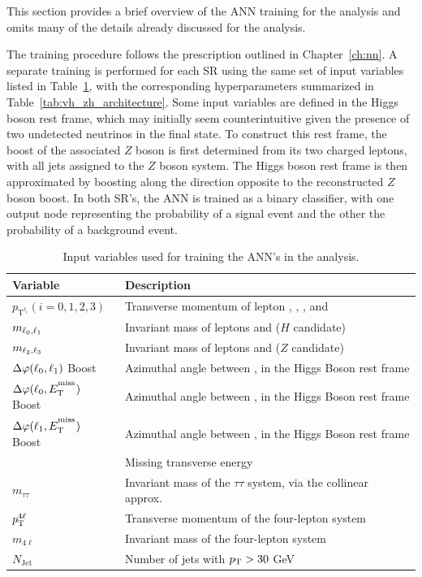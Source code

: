 This section provides a brief overview of the ANN training for the \zh{} analysis and omits many of the details already discussed for the \wh{} analysis.

The training procedure follows the prescription outlined in Chapter~\ref{ch:nn}. A separate training is performed for each SR using the same set of input variables listed in Table~\ref{tab:vh_zh_input_variables}, with the corresponding hyperparameters summarized in Table~\ref{tab:vh_zh_architecture}. Some input variables are defined in the Higgs boson rest frame, which may initially seem counterintuitive given the presence of two undetected neutrinos in the final state. To construct this rest frame, the boost of the associated $Z$ boson is first determined from its two charged leptons, with all jets assigned to the $Z$ boson system. The Higgs boson rest frame is then approximated by boosting along the direction opposite to the reconstructed $Z$ boson boost. In both SR's, the ANN is trained as a binary classifier, with one output node representing the probability of a \zh{} signal event and the other the probability of a background event.
\begin{table}
\centering
  \begin{tabular}{l@{ : }l}
    \hline
    \textbf{Variable} & \textbf{Description} \\
    \hline
    $p_{\mathrm{T}^{\ell_{i}}}(i = 0, 1, 2, 3)$ & Transverse momentum of lepton \lzero{}, \lone{}, \ltwo{}, and \lthree{} \\
    $m_{\ell_{0}{}, \ell_{1}{}}$ & Invariant mass of leptons \lzero{} and \lone{} ($H$ candidate) \\
    $m_{\ell_{2}{}, \ell_{3}{}}$ & Invariant mass of leptons \ltwo{} and \lthree{} ($Z$ candidate) \\
    $\Delta{\varphi}(\ell_{0}{}, \ell_{1}{})$ Boost & Azimuthal angle between \lzero{}, \lone{} in the Higgs Boson rest frame \\
    $\Delta{\varphi}(\ell_{0}{}, E_{\mathrm{T}}^{\textsuperscript{miss}}{})$ Boost & Azimuthal angle between \lzero{}, \met{} in the Higgs Boson rest frame \\
    $\Delta{\varphi}(\ell_{1}{}, E_{\mathrm{T}}^{\textsuperscript{miss}}{})$ Boost & Azimuthal angle between \lone{}, \met{} in the Higgs Boson rest frame \\
    \met{} & Missing transverse energy \\
    $m_{\tau\tau}$ & Invariant mass of the $\tau\tau$ system, via the collinear approx.~\cite{Plehn:1999xi} \\
    $p_{\mathrm{T}}^{4\ell}$ & Transverse momentum of the four-lepton system \\
    $m_{4\ell}$ & Invariant mass of the four-lepton system \\
    $N_{\mathrm{Jet}}$ & Number of jets with $p_{\mathrm{T}} > 30$ GeV \\
    \hline
  \end{tabular}
  \caption{Input variables used for training the ANN's in the \zh{} analysis. }\label{tab:vh_zh_input_variables}
\end{table}

